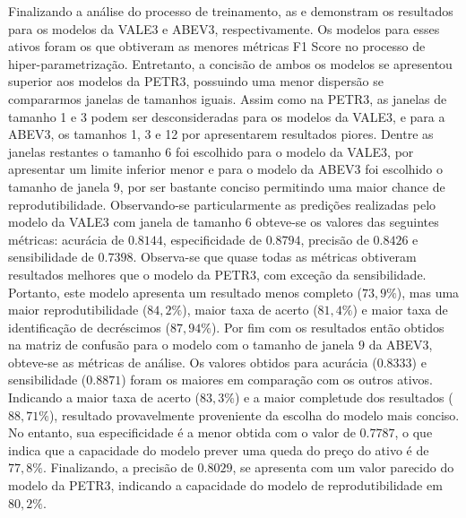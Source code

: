 Finalizando a análise do processo de treinamento, as  e  demonstram os resultados para os modelos da VALE3 e ABEV3, respectivamente. Os modelos para esses ativos foram os que obtiveram as menores métricas F1 Score no processo de hiper-parametrização. Entretanto, a concisão de ambos os modelos se apresentou superior aos modelos da PETR3, possuindo uma menor dispersão se compararmos janelas de tamanhos iguais. Assim como na PETR3, as janelas de tamanho 1 e 3 podem ser desconsideradas para os modelos da VALE3, e para a ABEV3, os tamanhos 1, 3 e 12 por apresentarem resultados piores. Dentre as janelas restantes o tamanho 6 foi escolhido para o modelo da VALE3, por apresentar um limite inferior menor e para o modelo da ABEV3 foi escolhido o tamanho de janela 9, por ser bastante conciso permitindo uma maior chance de reprodutibilidade. Observando-se particularmente as predições realizadas pelo modelo da VALE3 com janela de tamanho 6 obteve-se os valores das seguintes métricas: acurácia de $0.8144$, especificidade de $0.8794$, precisão de $0.8426$ e sensibilidade de $0.7398$. Observa-se que quase todas as métricas obtiveram resultados melhores que o modelo da PETR3, com exceção da sensibilidade. Portanto, este modelo apresenta um resultado menos completo ($73,9\%$), mas uma maior reprodutibilidade ($84,2\%$), maior taxa de acerto ($81,4\%$) e maior taxa de identificação de decréscimos ($87,94\%$). Por fim com os resultados então obtidos na matriz de confusão para o modelo com o tamanho de janela $9$ da ABEV3, obteve-se as métricas de análise. Os valores obtidos para acurácia ($0.8333$) e sensibilidade ($0.8871$) foram os maiores em comparação com os outros ativos. Indicando a maior taxa de acerto ($83,3\%$) e a maior completude dos resultados ($88,71\%$), resultado provavelmente proveniente da escolha do modelo mais conciso. No entanto, sua especificidade é a menor obtida com o valor de $0.7787$, o que indica que a capacidade do modelo prever uma queda do preço do ativo é de $77,8\%$. Finalizando, a precisão de $0.8029$, se apresenta com um valor parecido do modelo da PETR3, indicando a capacidade do modelo de reprodutibilidade em $80,2\%$.

